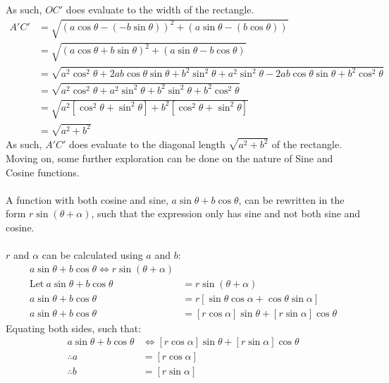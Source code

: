\documentclass{article}
\begin{document}
        As such, $OC'$ does evaluate to the width of the rectangle.
        \begin{align*}
        	A'C' &= \sqrt{(a\cos\theta - (-b\sin\theta))^2 + (a\sin\theta - (b\cos\theta))} \\
        	&= \sqrt{(a\cos\theta + b\sin\theta)^2 + (a\sin\theta - b\cos\theta)} \\
        	&= \sqrt{a^2\cos^2\theta + 2ab\cos\theta\sin\theta + b^2\sin^2\theta + a^2\sin^2\theta - 2ab\cos\theta\sin\theta + b^2\cos^2\theta} \\
        	&= \sqrt{a^2\cos^2\theta + a^2\sin^2\theta + b^2\sin^2\theta + b^2\cos^2\theta} \\
        	&= \sqrt{a^2[\cos^2\theta + \sin^2\theta] + b^2[\cos^2\theta + \sin^2\theta]} \\
        	&= \sqrt{a^2 + b^2}
        \end{align*}
        As such, $A'C'$ does evaluate to the diagonal length $\sqrt{a^2 + b^2}$ of the rectangle.
        \newpage
        Moving on, some further exploration can be done on the nature of Sine and Cosine functions.
        \\\\
        A function with both cosine and sine, $a\sin{\theta} + b\cos{\theta}$, can be rewritten in the form $r\sin{(\theta + \alpha)}$, such that the expression only has sine and not both sine and cosine.
        \\\\
        $r$ and $\alpha$ can be calculated using $a$ and $b$:
        \begin{align*}
            a\sin{\theta} + b\cos{\theta} \Leftrightarrow r\sin{(\theta + \alpha)} \\
            \mathrm{Let \ } a\sin{\theta} + b\cos{\theta} &= r\sin{(\theta + \alpha)} \\
            a\sin{\theta} + b\cos{\theta} &= r[\sin\theta\cos\alpha + \cos\theta\sin\alpha] \\
            a\sin{\theta} + b\cos{\theta} &= [r\cos\alpha]\sin{\theta} + [r\sin\alpha]\cos{\theta}
        \end{align*}
        Equating both sides, such that:
        \begin{align*}
            a\sin{\theta} + b\cos{\theta} &\Leftrightarrow [r\cos\alpha]\sin{\theta} + [r\sin\alpha]\cos{\theta} \\
            \therefore a &= [r\cos\alpha] \\
            \therefore b &= [r\sin\alpha]
        \end{align*}
\end{document}
